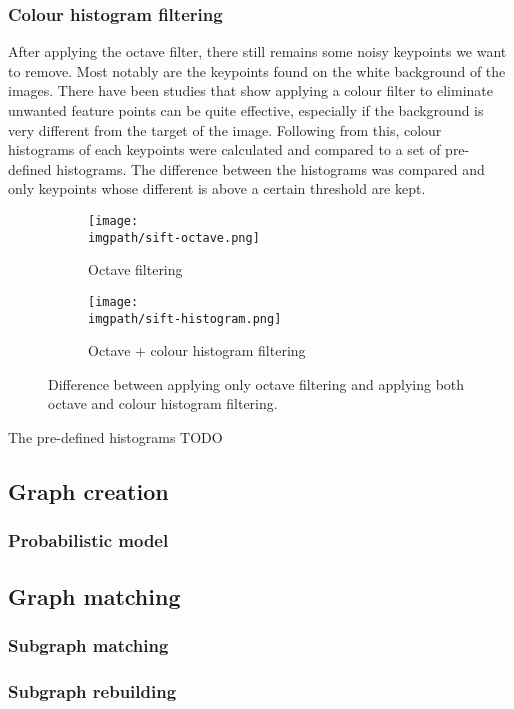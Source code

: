 \subsubsection{Colour histogram filtering}
After applying the octave filter, there still remains some noisy keypoints we want to remove. Most notably are the keypoints found on the white background of the images. There have been studies \cite{color-histogram} \cite{color-filter} that show applying a colour filter to eliminate unwanted feature points can be quite effective, especially if the background is very different from the target of the image. Following from this, colour histograms of each keypoints were calculated and compared to a set of pre-defined histograms. The difference between the histograms was compared and only keypoints whose different is above a certain threshold are kept. 

\begin{figure}[H]
	\begin{subfigure}{0.5\textwidth}
	\texttt{[image: \\imgpath/sift-octave.png]}
	\caption{Octave filtering}
	\end{subfigure}
	\hspace*{\fill}
	\begin{subfigure}{0.5\textwidth}
	\texttt{[image: \\imgpath/sift-histogram.png]}
	\caption{Octave + colour histogram filtering}
	\end{subfigure}
\caption{Difference between applying only octave filtering and applying both octave and colour histogram filtering.}
\end{figure}
\noindent
The pre-defined histograms TODO

\subsection{Graph creation}

\subsubsection{Probabilistic model}\label{sec:probabilistic-model}


\subsection{Graph matching}

\subsubsection{Subgraph matching}

\subsubsection{Subgraph rebuilding}
